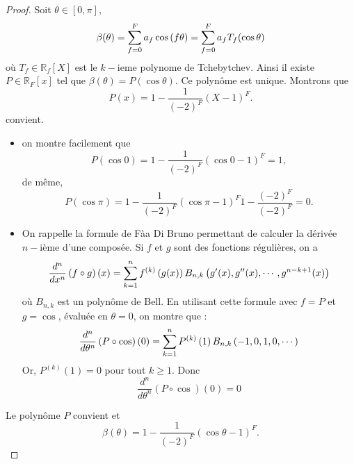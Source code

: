 \begin{proof}
Soit $\theta \in [0, \pi]$, 
\begin{equation}
\beta(\theta) = \displaystyle\sum\limits_{f=0}^F a_f \cos \left( f \theta \right) = \displaystyle\sum\limits_{f=0}^F a_f T_f ( \cos \theta )
\end{equation}
où $T_f \in \mathbb{R}_f [X]$ est le $k-$ieme polynome de Tchebytchev. 
Ainsi il existe $P \in \mathbb{R}_F [x]$ tel que $\beta( \theta ) = P( \cos \theta )$. Ce polynôme est unique. Montrons que 
\begin{equation}
P(x) = 1 -\dfrac{1}{(-2)^F} (X - 1)^F.
\end{equation}
convient.

\begin{itemize}
\item on montre facilement que 
\begin{equation}
P( \cos 0 ) = 1 -\dfrac{1}{(-2)^F} (\cos 0 - 1)^F = 1,
\end{equation}
de même,
\begin{equation}
P( \cos \pi ) = 1 -\dfrac{1}{(-2)^F} (\cos \pi - 1)^F 1 -\dfrac{(-2)^F}{(-2)^F} = 0.
\end{equation}
\item On rappelle la formule de Fàa Di Bruno permettant de calculer la dérivée $n-$ième d'une composée. Si $f$ et $g$ sont des fonctions régulières, on a 
\begin{equation}
\dfrac{d^n}{dx^n} \left( f \circ g \right)(x) = \displaystyle\sum\limits_{k=1}^n f^{(k)}\left( g(x) \right) B_{n,k}\left( g'(x), g''(x), \cdots , g^{n-k+1}(x) \right)
\end{equation}
où $B_{n,k}$ est un polynôme de Bell. En utilisant cette formule avec $f = P$ et $g = \cos$, évaluée en $\theta = 0$, on montre que :
\begin{equation}
\dfrac{d^n}{d\theta^n} \left( P \circ \cos \right)(0) = \displaystyle\sum\limits_{k=1}^n P^{(k)}\left(1\right) B_{n,k}\left( -1,0,1,0, \cdots\right)
\end{equation}
Or, $P^{(k)}\left(1\right) = 0$ pour tout $k \geq 1$. Donc 
\begin{equation}
\dfrac{d^n}{d\theta^n} \left( P \circ \cos \right)(0) = 0
\end{equation}
\end{itemize}
Le polynôme $P$ convient et 
\begin{equation}
\beta( \theta ) = 1 - \dfrac{1}{(-2)^F}(\cos \theta -1)^F.
\end{equation}
\end{proof}


